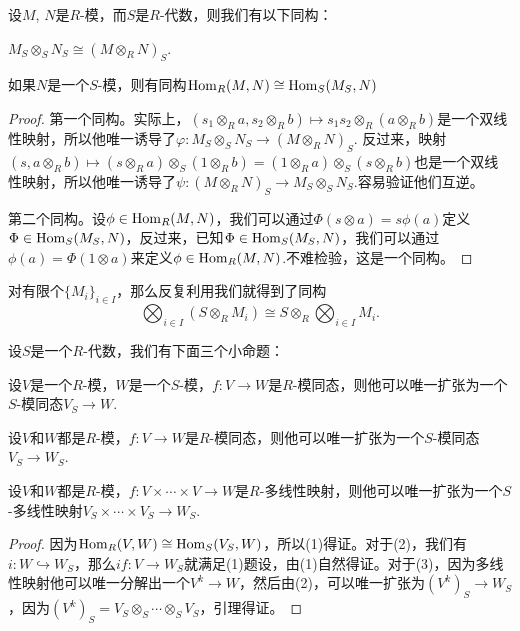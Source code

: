 \begin{lem}
设$M$, $N$是$R$-模，而$S$是$R$-代数，则我们有以下同构：
\begin{compactenum}[~~~(1)]
\item $M_S\otimes_S N_S\cong (M\otimes_R N)_S$.
\item 如果$N$是一个$S$-模，则有同构$\operatorname{Hom}_R(M,N)\cong \operatorname{Hom}_S(M_S,N)$
\end{compactenum}
\end{lem}

\begin{proof} 第一个同构。实际上，$(s_1\otimes_R a,s_2\otimes_R b)\mapsto s_1s_2\otimes_R(a\otimes_R b)$是一个双线性映射，所以他唯一诱导了$\varphi:M_S\otimes_S N_S\to (M\otimes_R N)_S$. 反过来，映射$(s,a\otimes_R b)\mapsto (s\otimes_R a)\otimes_S (1\otimes_R b)=(1\otimes_R a)\otimes_S (s\otimes_R b)$也是一个双线性映射，所以他唯一诱导了$\psi:(M\otimes_R N)_S\to M_S\otimes_S N_S$.容易验证他们互逆。

第二个同构。设$\phi\in \operatorname{Hom}_R(M,N)$，我们可以通过$\Phi(s\otimes a)=s\phi(a)$定义$\Phi\in \operatorname{Hom}_S(M_S,N)$，反过来，已知$\Phi\in \operatorname{Hom}_S(M_S,N)$，我们可以通过$\phi(a)=\Phi(1\otimes a)$来定义$\phi\in \operatorname{Hom}_R(M,N)$.不难检验，这是一个同构。 \end{proof}

对有限个$\{M_i\}_{i\in I}$，那么反复利用我们就得到了同构
\[
	\bigotimes_{i\in I} \left(S\otimes_RM_i\right)\cong S\otimes_R\bigotimes_{i\in I} M_i.
\]

\begin{pro}
设$S$是一个$R$-代数，我们有下面三个小命题：
\begin{compactenum}[~~~(1)]
\item 设$V$是一个$R$-模，$W$是一个$S$-模，$f:V\to W$是$R$-模同态，则他可以唯一扩张为一个$S$-模同态$V_S\to W$.
\item 设$V$和$W$都是$R$-模，$f:V\to W$是$R$-模同态，则他可以唯一扩张为一个$S$-模同态$V_S\to W_S$.
\item 设$V$和$W$都是$R$-模，$f:V\times\cdots\times V\to W$是$R$-多线性映射，则他可以唯一扩张为一个$S$-多线性映射$V_S\times\cdots\times V_S\to W_S$.
\end{compactenum}
\end{pro}

\begin{proof} 
	因为$\operatorname{Hom}_R(V,W)\cong \operatorname{Hom}_S(V_S,W)$，所以(1)得证。对于(2)，我们有$i:W\hookrightarrow W_S$，那么$if:V\to W_S$就满足(1)题设，由(1)自然得证。对于(3)，因为多线性映射他可以唯一分解出一个$V^k\to W$，然后由(2)，可以唯一扩张为$(V^k)_S\to W_S$，因为$(V^k)_S=V_S\otimes_S \cdots\otimes_S V_S$，引理得证。
\end{proof}

